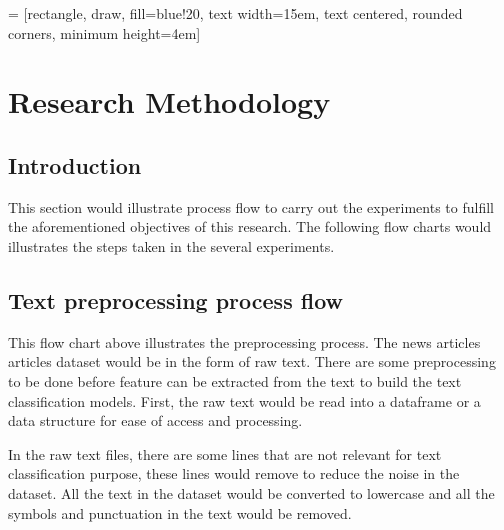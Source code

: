 
 = [rectangle, draw, fill=blue!20, 
text width=15em, text centered, rounded corners, minimum height=4em]


\chapter{Research Methodology}
\section{Introduction}
This section would illustrate process flow to carry out the experiments to fulfill the aforementioned objectives of this research. The following flow charts would illustrates the steps taken in the several experiments.

\section{Text preprocessing process flow}

This flow chart above illustrates the preprocessing process. The news articles articles dataset would be in the form of raw text. There are some preprocessing to be done before feature can be extracted from the text to build the text classification models. First, the raw text would be read into a dataframe or a data structure for ease of access and processing.

In the raw text files, there are some lines that are not relevant for text classification purpose, these lines would remove to reduce the noise in the dataset. All the text in the dataset would be converted to lowercase and all the symbols and punctuation in the text would be removed. \\

